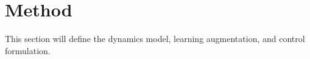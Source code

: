 \section{Method}

This section will define the dynamics model, learning augmentation, and control formulation.
